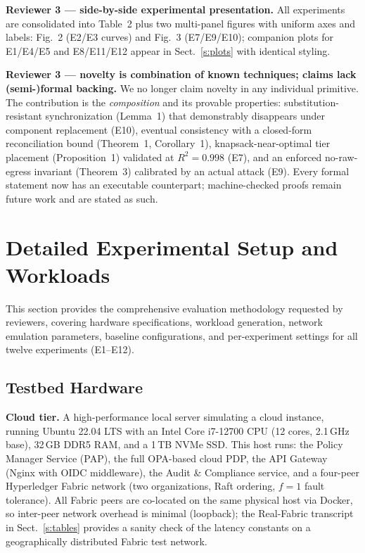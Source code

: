 \documentclass[runningheads]{llncs}
\begin{document}
\smallskip\noindent\textbf{Reviewer 3 --- side-by-side experimental presentation.}
All experiments are consolidated into Table~2 plus two multi-panel figures with uniform axes and labels: Fig.~2 (E2/E3 curves) and Fig.~3 (E7/E9/E10); companion plots for E1/E4/E5 and E8/E11/E12 appear in Sect.~\ref{s:plots} with identical styling.

\smallskip\noindent\textbf{Reviewer 3 --- novelty is combination of known techniques; claims lack (semi-)formal backing.}
We no longer claim novelty in any individual primitive. The contribution is the \emph{composition} and its provable properties: substitution-resistant synchronization (Lemma~1) that demonstrably disappears under component replacement (E10), eventual consistency with a closed-form reconciliation bound (Theorem~1, Corollary~1), knapsack-near-optimal tier placement (Proposition~1) validated at $R^2{=}0.998$ (E7), and an enforced no-raw-egress invariant (Theorem~3) calibrated by an actual attack (E9). Every formal statement now has an executable counterpart; machine-checked proofs remain future work and are stated as such.

\section{Detailed Experimental Setup and Workloads}
\label{s:setup}

This section provides the comprehensive evaluation methodology requested by reviewers, covering hardware specifications, workload generation, network emulation parameters, baseline configurations, and per-experiment settings for all twelve experiments (E1--E12).

\subsection*{Testbed Hardware}

\noindent\textbf{Cloud tier.} A high-performance local server simulating a cloud instance, running Ubuntu 22.04 LTS with an Intel Core i7-12700 CPU (12 cores, 2.1\,GHz base), 32\,GB DDR5 RAM, and a 1\,TB NVMe SSD. This host runs: the Policy Manager Service (PAP), the full OPA-based cloud PDP, the API Gateway (Nginx with OIDC middleware), the Audit \& Compliance service, and a four-peer Hyperledger Fabric network (two organizations, Raft ordering, $f{=}1$ fault tolerance). All Fabric peers are co-located on the same physical host via Docker, so inter-peer network overhead is minimal (loopback); the Real-Fabric transcript in Sect.~\ref{s:tables} provides a sanity check of the latency constants on a geographically distributed Fabric test network.
\end{document}
